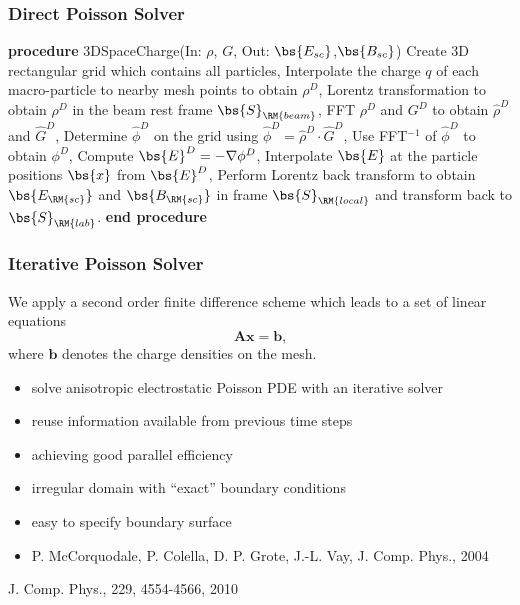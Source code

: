 \documentclass[xcolor=pdftex,table,10pt,yellow,mathserif]{beamer}
\begin{document}
\begin{frame}
		\frametitle{Direct Poisson Solver}
		\begin{block}{}
		\begin{algorithmic}[1]
		    \STATE \textbf{procedure} 3DSpaceCharge(In: $\rho$, $G$, Out: $\bs{E_{sc}}$,$\bs{B_{sc}}$)
       \STATE Create 3D rectangular grid which contains all particles, %
       \STATE Interpolate the charge $q$ of each macro-particle to nearby mesh points to obtain $\rho^D$, 
       \STATE Lorentz transformation to obtain $\rho^D$ in the beam rest frame $\bs{S}_{\RM{beam}}$,
       \STATE FFT $\rho^D$ and $G^D$ to obtain $\widehat{\rho}^D$ and $\widehat{G}^D$,
       \STATE Determine $\widehat{\phi}^D$ on the grid using $\widehat{\phi}^D = \widehat{\rho}^D \cdot \widehat{G}^D$,
       \STATE Use FFT$^{-1}$ of $\widehat{\phi }^D$ to obtain $\phi^D$,
       \STATE Compute $\bs{E}^D= -\nabla \phi^D$,
       \STATE Interpolate $\bs{E}$ at the particle positions $\bs{x}$ from $\bs{E}^D$,
       \STATE Perform Lorentz back transform to obtain $\bs{E_{\RM{sc}}}$ and $\bs{B_{\RM{sc}}}$ in  frame $\bs{S}_{\RM{local}}$ and transform back  to $\bs{S}_{\RM{lab}}$.
       \STATE \textbf{end procedure}	
			
					\end{algorithmic}
		\end{block}

	\end{frame}

\begin{frame}
\frametitle{Iterative Poisson Solver \oursolver}
\begin{block}{}
We apply a second order finite difference scheme which leads to a set of linear equations
		\[
			\mathbf{A} \mathbf{x} = \mathbf{b} \text{,}
		\]
		where $\textbf{b}$ denotes the charge densities on the mesh.
\end{block}
\begin{alertblock}{}
		\begin{itemize}
		
			\item solve anisotropic electrostatic Poisson PDE with an iterative solver
            \item reuse information available from previous time steps
            \item achieving good parallel efficiency
			\item irregular domain with ``exact'' boundary conditions
            \item easy to specify boundary surface
            \item P. McCorquodale, P. Colella, D. P. Grote, J.-L. Vay, J. Comp. Phys., 2004
            
		\end{itemize}
		
		
		
			
		\end{alertblock}
\small{J. Comp. Phys., 229, 4554-4566, 2010}
\end{frame}
\end{document}
